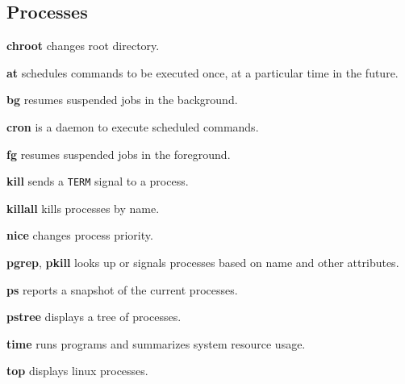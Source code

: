 \subsection{Processes}
\textbf{chroot} changes root directory.

\textbf{at} schedules commands to be executed once, 
at a particular time in the future.

\textbf{bg} resumes suspended jobs in the background.

\textbf{cron} is a daemon to execute scheduled commands.

\textbf{fg} resumes suspended jobs in the foreground.

\textbf{kill} sends a \texttt{TERM} signal to a process.

\textbf{killall} kills processes by name.

\textbf{nice} changes process priority.

\textbf{pgrep}, \textbf{pkill} looks up or signals 
processes based on name and other attributes.

\textbf{ps} reports a snapshot of the current processes.

\textbf{pstree} displays a tree of processes.

\textbf{time} runs programs and summarizes system resource usage. 

\textbf{top} displays linux processes.

